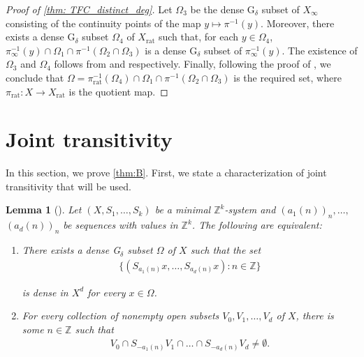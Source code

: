 \documentclass[11pt,reqno]{amsart}
\newcommand{\Z}{\mathbb{Z}}
\newtheorem{lemma}[lemma]{Lemma}
\theoremstyle{definition}
\theoremstyle{remark}
\begin{document}
\begin{proof}[Proof of \cref{thm: TFC_distinct_deg}]
    Let $\Omega_{3}$ be the dense G$_\delta$ subset of $X_\infty$ consisting of the continuity points of the map $y\mapsto \pi^{-1}(y)$. Moreover, there exists a dense G$_\delta$ subset $\Omega_4$ of $X_{\operatorname{rat}}$ such that, for each $y\in \Omega_4$, $\pi_{\infty}^{-1}(y)\cap \Omega_{1} \cap \pi^{-1}(\Omega_2 \cap \Omega_3)$ is a dense G$_\delta$ subset of $\pi_{\infty}^{-1}(y)$. The existence of $\Omega_3$ and $\Omega_4$ follows from {\cite[Lemma 2.7]{Ye_Yu_polynomial_saturation:2025}} and {\cite[Proposition 3.1]{Veech_point-distal_flows:1970}} respectively. Finally, following the proof of {\cite[Theorem A]{Ye_Yu_polynomial_saturation:2025}}, we conclude that $\Omega = \pi_{\operatorname{rat}}^{-1}(\Omega_4)\cap \Omega_{1} \cap \pi^{-1}(\Omega_2 \cap \Omega_3)$ is the required set, where $\pi_{\operatorname{rat}}: X\to X_{\operatorname{rat}}$ is the quotient map.
\end{proof}

\section{Joint transitivity}

In this section, we prove \cref{thm:B}. First, we state a characterization of joint transitivity that will be used.

\begin{lemma}[{\cite[Lemma 2.1]{Donoso_Koutsogiannis_Sun_joint_transitivity:2025}}]
    Let $(X,S_1,\dots,S_k)$ be a minimal $\Z^k$-system and $(a_1(n))_n,\dots,$ $(a_d(n))_n$ be sequences with values in $\Z^k$. The following are equivalent:\begin{enumerate}
        \item There exists a dense G$_\delta$ subset $\Omega$ of $X$ such that the set\begin{align*}
            \{(S_{a_1(n)}x,\dots,S_{a_d(n)}x)\colon n\in\Z\}
        \end{align*}

        is dense in $X^d$ for every $x\in \Omega$.

        \item For every collection of nonempty open subsets $V_0,V_1,\dots,V_d$ of $X$, there is some $n\in \Z$ such that\begin{align*}
            V_0 \cap S_{-a_1(n)}V_1 \cap \dots \cap S_{-a_d(n)}V_d \neq \emptyset.
        \end{align*}
    \end{enumerate}
\end{lemma}
\end{document}
